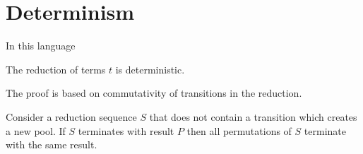 \section{Determinism}

In this language 

\begin{theorem}
The reduction of terms $t$ is deterministic.
\end{theorem}

The proof is based on commutativity of transitions in the reduction.

\begin{lemma}
Consider a reduction sequence $S$ that does not contain a transition which creates a new pool.
If $S$ terminates with result $P$ then all permutations of $S$ terminate with the same result.
\end{lemma}
